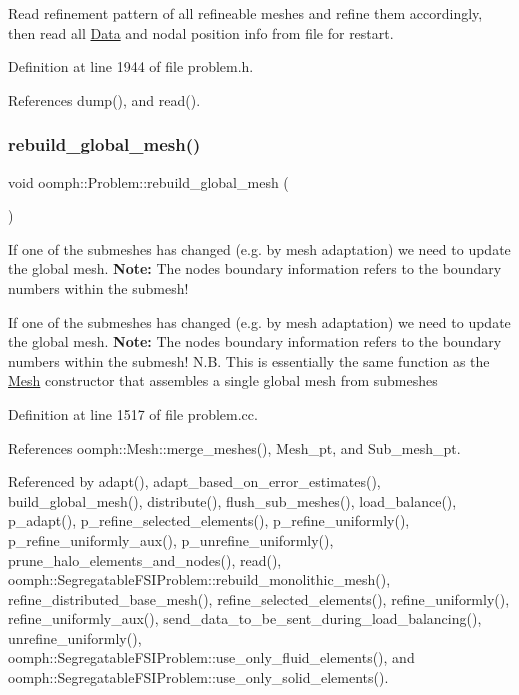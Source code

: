 Read refinement pattern of all refineable meshes and refine them accordingly, then read all \hyperlink{classoomph_1_1Data}{Data} and nodal position info from file for restart. 



Definition at line 1944 of file problem.\+h.



References dump(), and read().

\mbox{\label{classoomph_1_1Problem_ac0a0e649f36b4a7ce992888c323d1571}} 
\subsubsection{\texorpdfstring{rebuild\+\_\+global\+\_\+mesh()}{rebuild\_global\_mesh()}}
{\footnotesize\ttfamily void oomph\+::\+Problem\+::rebuild\+\_\+global\+\_\+mesh (\begin{DoxyParamCaption}{ }\end{DoxyParamCaption})}



If one of the submeshes has changed (e.\+g. by mesh adaptation) we need to update the global mesh. {\bfseries Note\+:} The nodes boundary information refers to the boundary numbers within the submesh! 

If one of the submeshes has changed (e.\+g. by mesh adaptation) we need to update the global mesh. {\bfseries Note\+:} The nodes boundary information refers to the boundary numbers within the submesh! N.\+B. This is essentially the same function as the \hyperlink{classoomph_1_1Mesh}{Mesh} constructor that assembles a single global mesh from submeshes 

Definition at line 1517 of file problem.\+cc.



References oomph\+::\+Mesh\+::merge\+\_\+meshes(), Mesh\+\_\+pt, and Sub\+\_\+mesh\+\_\+pt.



Referenced by adapt(), adapt\+\_\+based\+\_\+on\+\_\+error\+\_\+estimates(), build\+\_\+global\+\_\+mesh(), distribute(), flush\+\_\+sub\+\_\+meshes(), load\+\_\+balance(), p\+\_\+adapt(), p\+\_\+refine\+\_\+selected\+\_\+elements(), p\+\_\+refine\+\_\+uniformly(), p\+\_\+refine\+\_\+uniformly\+\_\+aux(), p\+\_\+unrefine\+\_\+uniformly(), prune\+\_\+halo\+\_\+elements\+\_\+and\+\_\+nodes(), read(), oomph\+::\+Segregatable\+F\+S\+I\+Problem\+::rebuild\+\_\+monolithic\+\_\+mesh(), refine\+\_\+distributed\+\_\+base\+\_\+mesh(), refine\+\_\+selected\+\_\+elements(), refine\+\_\+uniformly(), refine\+\_\+uniformly\+\_\+aux(), send\+\_\+data\+\_\+to\+\_\+be\+\_\+sent\+\_\+during\+\_\+load\+\_\+balancing(), unrefine\+\_\+uniformly(), oomph\+::\+Segregatable\+F\+S\+I\+Problem\+::use\+\_\+only\+\_\+fluid\+\_\+elements(), and oomph\+::\+Segregatable\+F\+S\+I\+Problem\+::use\+\_\+only\+\_\+solid\+\_\+elements().

